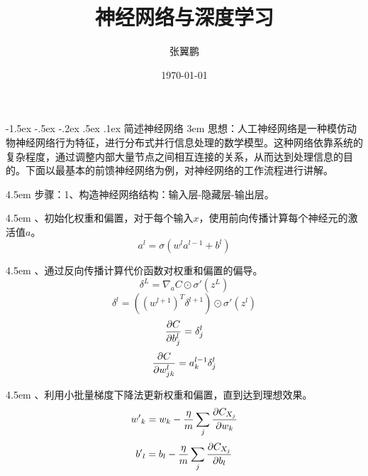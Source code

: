 \documentclass[a4paper, 11pt]{article}
\makeatletter
\newcommand{\sihao}{\fontsize{14pt}{\baselineskip}\selectfont}
\renewcommand\section{\@startsection{section}{1}{\z@}%
{-1.5ex \@plus -.5ex \@minus -.2ex}%
{.5ex \@plus .1ex}%
{\normalfont\sihao\CJKfamily{hei}}}
\makeatother
\begin{document}
\begin{CJK*}{GBK}{song}

\newtheorem{example}{例}             %
\newtheorem{algorithm}{算法}
\newtheorem{theorem}{定理}[section]  %
\newtheorem{definition}{定义}
\newtheorem{axiom}{公理}
\newtheorem{property}{性质}
\newtheorem{proposition}{命题}
\newtheorem{lemma}{引理}
\newtheorem{corollary}{推论}
\newtheorem{remark}{注解}
\newtheorem{condition}{条件}
\newtheorem{conclusion}{结论}
\newtheorem{assumption}{假设}

\renewcommand{\contentsname}{目录}  %
\renewcommand{\abstractname}{摘要}  %
\renewcommand{\refname}{参考文献}   %
\renewcommand{\indexname}{索引}
\renewcommand{\figurename}{图}
\renewcommand{\tablename}{表}
\renewcommand{\appendixname}{附录}
\renewcommand{\algorithm}{算法}


\title{神经网络与深度学习}
\date{\today}
\author{张翼鹏}


\maketitle
\tableofcontents
\newpage
\section{简述神经网络}
\hangindent 3em
思想：人工神经网络是一种模仿动物神经网络行为特征，进行分布式并行信息处理的数学模型。这种网络依靠系统的复杂程度，通过调整内部大量节点之间相互连接的关系，从而达到处理信息的目的。下面以最基本的前馈神经网络为例，对神经网络的工作流程进行讲解。

\hangindent 4.5em
步骤：1、构造神经网络结构：输入层-隐藏层-输出层。

\hangindent 4.5em
\quad\quad{}、初始化权重和偏置，对于每个输入$x$，使用前向传播计算每个神经元的激活值$a$。
$${a^l} = \sigma ({w^l}{a^{l - 1}} + {b^l})$$

\hangindent 4.5em
\quad\quad{}、通过反向传播计算代价函数对权重和偏置的偏导。
$${\delta ^L} = {\nabla _a}C \odot \sigma '({z^L})$$
$${\delta ^l} = ({({w^{l + 1}})^T}{\delta ^{l + 1}}) \odot \sigma '({z^l})$$
$${{\partial C} \over {\partial b_j^l}} = \delta _j^l$$
$${{\partial C} \over {\partial w_{jk}^l}} = a_k^{l - 1}\delta _j^l$$

\hangindent 4.5em
\quad\quad{}、利用小批量梯度下降法更新权重和偏置，直到达到理想效果。
$${{w'}_k} = {w_k} - {\eta  \over m}\sum\limits_j {{{\partial {C_{{X_j}}}} \over {\partial {w_k}}}} $$
$${{b'}_l} = {b_l} - {\eta  \over m}\sum\limits_j {{{\partial {C_{{X_j}}}} \over {\partial {b_l}}}} $$


\end{CJK*}
\end{document}
